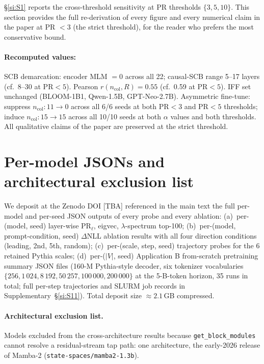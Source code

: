 \documentclass[11pt,a4paper]{article}
\begin{document}
\S\ref{si:S1} reports the cross-threshold sensitivity at PR
thresholds $\{3, 5, 10\}$.  This section provides the full
re-derivation of every figure and every numerical claim in the paper
at PR $< 3$ (the strict threshold), for the reader who prefers the
most conservative bound.

\paragraph{Recomputed values:}
SCB demarcation: encoder MLM $= 0$ across all 22; causal-SCB range
5--17 layers (cf.\ 8--30 at PR$<5$).
Pearson $r(n_\mathrm{col}, R) = 0.55$ (cf.\ 0.59 at PR$<5$).
IFF set unchanged (BLOOM-1B1, Qwen-1.5B, GPT-Neo-2.7B).
Asymmetric fine-tune: suppress $n_\mathrm{col}\!:\!11\!\to\!0$
across all 6/6 seeds at both PR$<3$ and PR$<5$ thresholds; induce
$n_\mathrm{col}\!:\!15\!\to\!15$ across all 10/10 seeds at both
$\alpha$ values and both thresholds. All qualitative claims of
the paper are preserved at the strict threshold.

\section{Per-model JSONs and architectural exclusion list}
\label{si:S10}

We deposit at the Zenodo DOI [TBA] referenced in the main text the
full per-model and per-seed JSON outputs of every probe and every
ablation:
(a)~per-(model, seed) layer-wise $\mathrm{PR}_\ell$, eigvec,
$\lambda$-spectrum top-100;
(b)~per-(model, prompt-condition, seed) $\Delta$NLL ablation results
with all four direction conditions (leading, 2nd, 5th, random);
(c)~per-(scale, step, seed) trajectory probes for the 6 retained
Pythia scales;
(d)~per-($|V|$, seed) Application B from-scratch pretraining
summary JSON files (160-M Pythia-style decoder, six tokenizer
vocabularies $\{256, 1\,024, 8\,192, 50\,257, 100\,000, 200\,000\}$
at the 5-B-token horizon, 35 runs in total; full per-step
trajectories and SLURM job records in Supplementary~\S\ref{si:S11}).
Total deposit size $\approx 2.1$\,GB compressed.

\paragraph{Architectural exclusion list.}
Models excluded from the cross-architecture results because
\texttt{get\_block\_modules} cannot resolve a residual-stream tap
path: one architecture, the early-2026 release of Mamba-2
(\texttt{state-spaces/mamba2-1.3b}).
\end{document}

